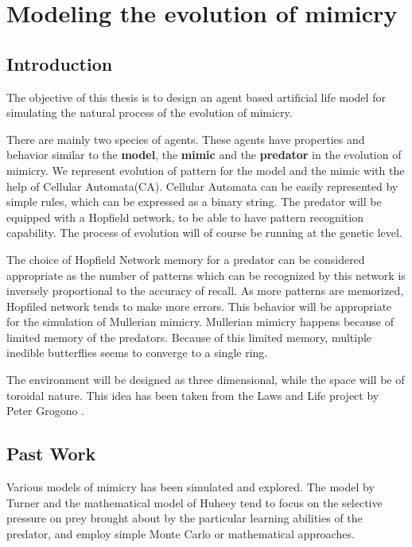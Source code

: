 \chapter{Modeling the evolution of mimicry}

\section{Introduction}
The objective of this thesis is to design an agent based artificial life model for simulating the natural process of the evolution of mimicry.

There are mainly two species of agents. These agents have properties and behavior similar to the \textbf{model}, the \textbf{mimic} and the \textbf{predator} in the evolution of mimicry. We represent evolution of pattern for the model and the mimic with the help of Cellular Automata(CA). Cellular Automata can be easily represented by simple rules, which can be expressed as a binary string. The predator will be equipped with a Hopfield network, to be able to have pattern recognition capability. The process of evolution will of course be running at the genetic level. 

The choice of Hopfield Network memory for a predator can be considered appropriate as the number of patterns which can be recognized by this network is inversely proportional to the accuracy of recall. As more patterns are memorized, Hopfiled network tends to make more errors. This behavior will be appropriate for the simulation of Mullerian mimicry. Mullerian mimicry happens because of limited memory of the predators. Because of this limited memory, multiple inedible butterflies seems to converge to a single ring.

The environment will be designed as three dimensional, while the space will be of toroidal nature. This idea has been taken from the Laws and Life project by Peter Grogono \cite{grogono2003}.

\section{Past Work}
Various models of mimicry has been simulated and explored. The model by Turner \cite{turner1996} and the mathematical model of Huheey \cite{huheey1988} tend to focus on the selective pressure on prey brought about by the particular learning abilities of the predator, and employ simple Monte Carlo or mathematical approaches.

